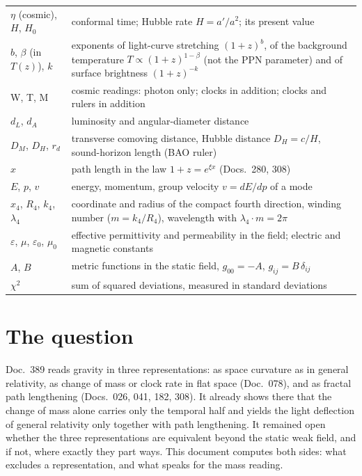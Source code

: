 \begin{center}
\begin{tabular}{@{}p{3.3cm}p{11.2cm}@{}}
$\eta$ (cosmic), $H$, $H_0$ & conformal time; Hubble rate $H=a'/a^2$; its present value \\
$b$, $\beta$ (in $T(z)$), $k$ & exponents of light-curve stretching $(1+z)^b$, of the background
temperature $T\propto(1+z)^{1-\beta}$ (not the PPN parameter) and of surface brightness
$(1+z)^{-k}$ \\
W, T, M & cosmic readings: photon only; clocks in addition; clocks and rulers in addition \\
$d_L$, $d_A$ & luminosity and angular-diameter distance \\
$D_M$, $D_H$, $r_d$ & transverse comoving distance, Hubble distance $D_H=c/H$, sound-horizon length
(BAO ruler) \\
$x$ & path length in the law $1+z=e^{\xi x}$ (Docs.~280, 308) \\
$E$, $p$, $v$ & energy, momentum, group velocity $v=dE/dp$ of a mode \\
$x_4$, $R_4$, $k_4$, $\lambda_4$ & coordinate and radius of the compact fourth direction, winding number
($m=k_4/R_4$), wavelength with $\lambda_4\cdot m=2\pi$ \\
$\varepsilon$, $\mu$, $\varepsilon_0$, $\mu_0$ & effective permittivity and permeability in the field;
electric and magnetic constants \\
$A$, $B$ & metric functions in the static field, $g_{00}=-A$, $g_{ij}=B\,\delta_{ij}$ \\
$\chi^2$ & sum of squared deviations, measured in standard deviations \\
\bottomrule
\end{tabular}
\end{center}

\section{The question}

Doc.~389 reads gravity in three representations: as space curvature as in general relativity, as
change of mass or clock rate in flat space (Doc.~078), and as fractal path lengthening (Docs.~026,
041, 182, 308). It already shows there that the change of mass alone carries only the temporal half
and yields the light deflection of general relativity only together with path lengthening. It
remained open whether the three representations are equivalent beyond the static weak field, and if
not, where exactly they part ways. This document computes both sides: what excludes a
representation, and what speaks for the mass reading.

